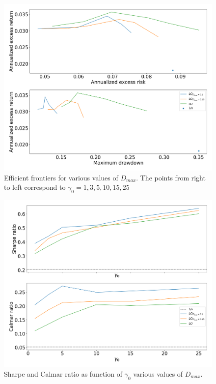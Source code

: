 \begin{figure}[H]
    \centering
    \includegraphics[width=1\textwidth]{analysis/portfolio_exercise/images/mle/frontier_lo.png}
    \caption[Efficient frontiers for various values of $D_{max}$]{Efficient frontiers for various values of $D_{max}$. The points from right to left correspond to $\gamma_0=1,3,5,10,15,25$}
    \label{fig:MPC_frontier_lo}
\end{figure}

\begin{figure}[H]
    \centering
    \includegraphics[width=1\textwidth]{analysis/portfolio_exercise/images/mle/sharpe_frontier_lo.png}
    \caption[Sharpe and Calmar ratio as function of $\gamma_0$ various values of $D_{max}$]{Sharpe and Calmar ratio as function of $\gamma_0$ various values of $D_{max}$.}
    \label{fig:MPC_sharpe_frontier_lo}
\end{figure}


